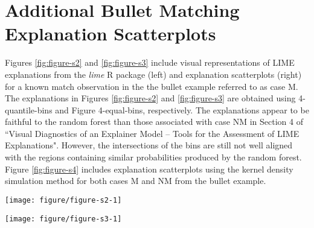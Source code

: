 \documentclass[9pt]{article}\usepackage[]{graphicx}\usepackage[]{color}
\newenvironment{knitrout}{}{} %
\begin{document}
\section{Additional Bullet Matching Explanation Scatterplots} \label{bullets-plus}

Figures \ref{fig:figure-s2} and \ref{fig:figure-s3} include visual representations of LIME explanations from the \emph{lime} R package (left) and explanation scatterplots (right) for a known match observation in the the bullet example referred to as case M. The explanations in Figures \ref{fig:figure-s2} and \ref{fig:figure-s3} are obtained using 4-quantile-bins and Figure 4-equal-bins, respectively. The explanations appear to be faithful to the random forest than those associated with case NM in Section 4 of ``Visual Diagnostics of an Explainer Model -- Tools for the Assessment of LIME Explanations". However, the intersections of the bins are still not well aligned with the regions containing similar probabilities produced by the random forest. Figure \ref{fig:figure-s4} includes explanation scatterplots using the kernel density simulation method for both cases M and NM from the bullet example.

\vspace{0.5cm}



\renewcommand{\thefigure}{S2}
\begin{figure*}[!h]
\begin{knitrout}
\color{fgcolor}

{\centering \texttt{[image: figure/figure-s2-1]} 

}



\end{knitrout}
\caption{Explanation plot from \emph{lime} R package (left) and explanation scatterplot (right) for case M in the bullet test data for 4-quantile-bins.}
\label{fig:figure-s2}
\end{figure*}

\renewcommand{\thefigure}{S3}
\begin{figure*}[!h]
\begin{knitrout}
\color{fgcolor}

{\centering \texttt{[image: figure/figure-s3-1]} 

}



\end{knitrout}
\caption{Explanation plot from \emph{lime} R package (left) and explanation scatterplot (right) for case M in the bullet test data for 4-equal-bins.}
\label{fig:figure-s3}
\end{figure*}
\end{document}
